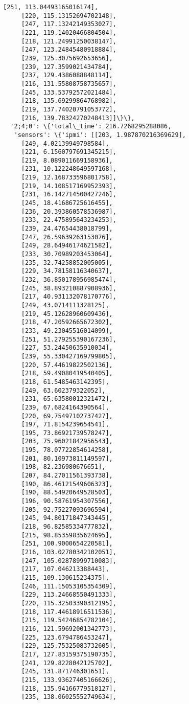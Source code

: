 \documentclass[11pt]{article}
\begin{document}
\begin{tcolorbox}[breakable, size=fbox, boxrule=.5pt, pad at break*=1mm, opacityfill=0]
\begin{Verbatim}[commandchars=\\\{\}]
     [251, 113.04493165016174],
     [220, 115.13152694702148],
     [247, 117.13242149353027],
     [221, 119.14020466804504],
     [218, 121.24991250038147],
     [247, 123.24845480918884],
     [239, 125.3075692653656],
     [239, 127.3599021434784],
     [237, 129.4386088848114],
     [216, 131.55808758735657],
     [245, 133.53792572021484],
     [218, 135.69299864768982],
     [219, 137.74020791053772],
     [216, 139.78324270248413]]\}\},
  '2;4;0': \{'total\_time': 216.7268295288086,
   'sensors': \{'ipmi': [[203, 1.987870216369629],
     [249, 4.02139949798584],
     [221, 6.1560797691345215],
     [219, 8.089011669158936],
     [231, 10.122248649597168],
     [219, 12.168733596801758],
     [219, 14.108517169952393],
     [231, 16.142714500427246],
     [245, 18.41686725616455],
     [236, 20.393860578536987],
     [233, 22.475895643234253],
     [239, 24.47654438018799],
     [247, 26.59639263153076],
     [249, 28.64946174621582],
     [233, 30.70989203453064],
     [235, 32.74258852005005],
     [229, 34.78158116340637],
     [232, 36.850178956985474],
     [245, 38.893210887908936],
     [217, 40.931132078170776],
     [249, 43.0714111328125],
     [219, 45.12628960609436],
     [218, 47.20592665672302],
     [233, 49.23045516014099],
     [251, 51.279255390167236],
     [227, 53.24450635910034],
     [239, 55.330427169799805],
     [220, 57.44619822502136],
     [218, 59.49080419540405],
     [218, 61.5485463142395],
     [249, 63.602379322052],
     [231, 65.63580012321472],
     [239, 67.6824164390564],
     [220, 69.75497102737427],
     [197, 71.8154239654541],
     [195, 73.86921739578247],
     [203, 75.96021842956543],
     [195, 78.07722854614258],
     [201, 80.10973811149597],
     [198, 82.236980676651],
     [207, 84.27011561393738],
     [190, 86.46121549606323],
     [190, 88.54920649528503],
     [196, 90.58761954307556],
     [205, 92.75227093696594],
     [245, 94.80171847343445],
     [218, 96.82585334777832],
     [215, 98.85359835624695],
     [251, 100.9000654220581],
     [216, 103.02780342102051],
     [247, 105.02878999710083],
     [217, 107.046213388443],
     [215, 109.130615234375],
     [246, 111.15053105354309],
     [229, 113.24668550491333],
     [220, 115.32503390312195],
     [218, 117.44618916511536],
     [215, 119.54246854782104],
     [216, 121.59692001342773],
     [225, 123.6794786453247],
     [229, 125.75325083732605],
     [217, 127.83159375190735],
     [241, 129.8228042125702],
     [245, 131.871746301651],
     [215, 133.93627405166626],
     [218, 135.94166779518127],
     [235, 138.06025552749634],

\end{Verbatim}
\end{tcolorbox}
\end{document}
